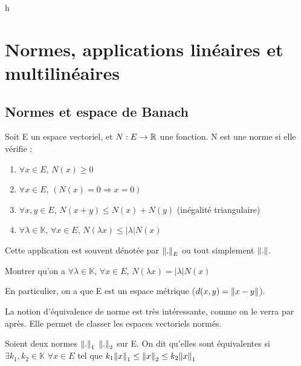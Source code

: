 h\chapter{Normes, applications linéaires et multilinéaires}
\label{chapter:linear_application}



\section{Normes et espace de Banach}

\begin{definition}
    Soit E un espace vectoriel, et $N : E \rightarrow 
\mathbb{R}$ une fonction.
    N est une norme si elle vérifie :
    \begin{enumerate}
        \item $\forall x \in E$, $N(x) \geq 0$
        \item $\forall x \in E$, $(N(x) = 0 \Rightarrow x = 0)$
        \item $\forall x, y \in E$, $N(x + y) \leq N(x) + N(y)$ (inégalité
            triangulaire)
        \item $\forall \lambda \in \mathbb{K}$, $\forall x \in E$, $N(\lambda x)
            \leq |\lambda| N(x)$
    \end{enumerate}
    Cette application est souvent dénotée par $\norm{.}_{E}$ ou tout simplement
    $\norm{.}$.
\end{definition}

\begin{exercice}
    Montrer qu'on a
    $\forall \lambda \in \mathbb{K}$, $\forall x \in E$, $N(\lambda x) =
    |\lambda| N(x)$
\end{exercice}

En particulier, on a que E est un espace métrique ($d(x, y) = \norm{x - y}$).

La notion d'équivalence de norme est très intéressante, comme on le verra par
après. Elle permet de classer les espaces vectoriels normés.

\begin{definition}
    Soient deux normes $\norm{.}_{1}$ $\norm{.}_{2}$ sur E. On dit
	qu'elles sont équivalentes si $\exists k_{1}, k_{2} \in \mathbb{K}$ $\forall
	x \in E$ tel que $k_{1} \norm{x}_{1} \leq \norm{x}_{2} \leq
	k_{2} \norm{x}_{1}$
\end{definition}

